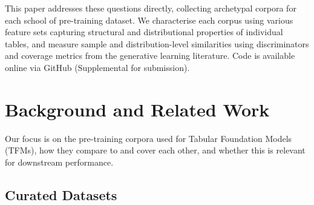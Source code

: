 \documentclass{article}
\newcommand{\nsa}[1]{\textcolor{blue!50!black}{\textsf{}{NSA:~~#1}}}
\begin{document}
This paper addresses these questions directly, collecting archetypal corpora for each school of pre-training dataset.
We characterise each corpus using various feature sets capturing structural and distributional properties of individual tables, and measure sample and distribution-level similarities using discriminators and coverage metrics from the generative learning literature. 
Code is available online via GitHub (Supplemental for submission).

\section{Background and Related Work}
\label{sec:background}




Our focus is on the pre-training corpora used for Tabular Foundation Models (TFMs), how they compare to and cover each other, and whether this is relevant for downstream performance.

\subsection{Curated Datasets}
\end{document}

